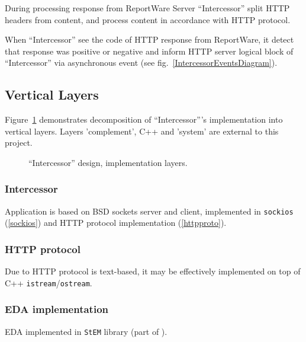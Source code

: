 \documentclass[a4paper,twoside]{article}
\newcommand{\Inter}{{\fontseries{b}\selectfont ``Intercessor''}}
\begin{document}
During processing response from ReportWare Server \Inter{} split HTTP headers from content,
and process content in accordance with HTTP protocol.

When \Inter{} see the code of HTTP response from ReportWare, it detect that response was
positive or negative and inform HTTP server logical block of \Inter{} via asynchronous event (see fig.~\ref{IntercessorEventsDiagram}).

\subsection{Vertical Layers}

Figure~\ref{IntercessorLayersDiagram} demonstrates decomposition of \Inter{}'s implementation into vertical layers. Layers 'complement', C++ and 'system' are external to this project.

\begin{figure}
\begin{center}
%  
\end{center}
\caption{\Inter{} design, implementation layers.\label{IntercessorLayersDiagram}}
\end{figure}

\subsubsection{Intercessor}

Application is based on BSD sockets server and client, implemented in \verb|sockios|
(\ref{sockios}) and HTTP protocol implementation (\ref{httpproto}).

\subsubsection{HTTP protocol\label{httpproto}}

Due to HTTP protocol is text-based, it may be effectively implemented
on top of C++ \verb|istream|/\verb|ostream|.

\subsubsection{EDA implementation\label{StEM}}

EDA implemented in \verb|StEM| library (part of \cite{ComplementProject}). 
\end{document}
